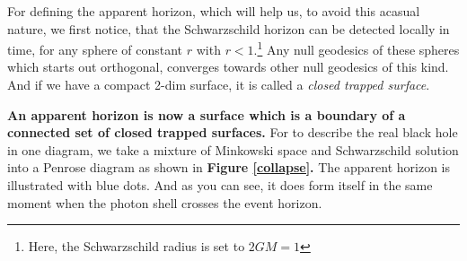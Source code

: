 	For defining the apparent horizon, which will help us, to avoid this acasual nature, we first notice, that the Schwarzschild horizon can be detected locally in time, for any sphere of constant $r$ with $r<1$.\footnote{Here, the Schwarzschild radius is set to $2GM=1$}
	Any null geodesics of these spheres which starts out orthogonal, converges towards other null geodesics of this kind. And if we have a compact 2-dim surface, it is called a \textit{closed trapped surface}.
	
	\textbf{An apparent horizon is now a surface which is a boundary of a connected set of closed trapped surfaces.}
	For to describe the real black hole in one diagram, we take a mixture of Minkowski space and Schwarzschild solution into a Penrose diagram as shown in \textbf{Figure \ref{collapse}.} The apparent horizon is illustrated with blue dots. And as you can see, it does form itself in the same moment when the photon shell crosses the event horizon.
				